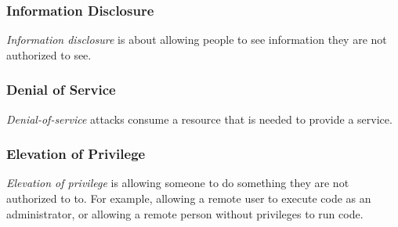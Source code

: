 \subsubsection{Information Disclosure}\label{subsubsec:Information_Disclosure}
\begin{definition}\label{def:Information_Disclosure}
  \emph{Information disclosure} is about allowing people to see information they are not authorized to see.
\end{definition}

\subsubsection{Denial of Service}\label{subsubsec:Denial_of_Service}
\begin{definition}\label{def:Denial_of_Service}
  \emph{Denial-of-service} attacks consume a resource that is needed to provide a service.
\end{definition}

\subsubsection{Elevation of Privilege}\label{subsubsec:Elevation_of_Privilege}
\begin{definition}\label{def:Elevation_of_Privilege}
  \emph{Elevation of privilege} is allowing someone to do something they are not authorized to to.
  For example, allowing a remote user to execute code as an administrator, or allowing a remote person without privileges to run code.
\end{definition}

